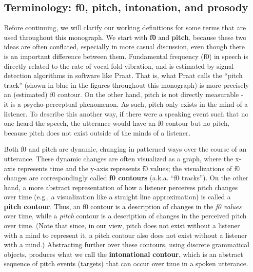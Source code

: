 \documentclass[11pt, twoside]{memoir}
\begin{document}
\subsection{Terminology: f0, pitch, intonation, and prosody}\label{sec:terminology}

Before continuing, we will clarify our working definitions for some terms that are used throughout this monograph. We start with \textbf{f0} and \textbf{pitch}, because these two ideas are often conflated, especially in more casual discussion, even though there is an important difference between them. Fundamental frequency (f0) in speech is directly related to the rate of vocal fold vibration, and is estimated by signal detection algorithms in software like Praat. That is, what Praat calls the “pitch track” (shown in blue in the figures throughout this monograph) is more precisely an (estimated) f0 contour. On the other hand, pitch is not directly measurable - it is a psycho-perceptual phenomenon. As such, pitch only exists in the mind of a listener. To describe this another way, if there were a speaking event such that no one heard the speech, the utterance would have an f0 contour but no pitch, because pitch does not exist outside of the minds of a listener.

Both f0 and pitch are dynamic, changing in patterned ways over the course of an utterance. These dynamic changes are often visualized as a graph, where the x-axis represents time and the y-axis represents f0 values; the visualizations of f0 changes are correspondingly called \textbf{f0 contours} (a.k.a. “f0 tracks”). On the other hand, a more abstract representation of how a listener perceives pitch changes over time (e.g., a visualization like a straight line approximation) is called a \textbf{pitch contour}. Thus, an f0 contour is a description of changes in the \emph{f0 values} over time, while a \emph{pitch} contour is a description of changes in the perceived pitch over time. (Note that since, in our view, pitch does not exist without a listener with a mind to represent it, a pitch contour also does not exist without a listener with a mind.) Abstracting further over these contours, using discrete grammatical objects, produces what we call the \textbf{intonational contour}, which is an abstract sequence of pitch events (targets) that can occur over time in a spoken utterance.
\end{document}
